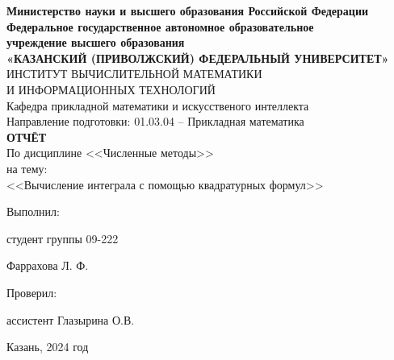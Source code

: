 \documentclass[a4paper,12pt]{article}
\begin{document}
\begin{center}
\hfill \break
\textbf{\large{Министерство науки и высшего образования Российской Федерации\\
Федеральное государственное автономное образовательное\\
учреждение высшего образования}}
\\
\large{\textbf{«КАЗАНСКИЙ (ПРИВОЛЖСКИЙ) ФЕДЕРАЛЬНЫЙ УНИВЕРСИТЕТ»}}\\
\hfill \break
\large{ИНСТИТУТ ВЫЧИСЛИТЕЛЬНОЙ МАТЕМАТИКИ\\ И ИНФОРМАЦИОННЫХ ТЕХНОЛОГИЙ}\\
 \hfill \break
\large{Кафедра прикладной математики и искусственого интеллекта}\\
\hfill\break
\hfill \break
\large{Направление подготовки: 01.03.04 – Прикладная математика}\\
\hfill \break
\hfill \break
\textbf{\large{ОТЧЁТ}}\\
\large{По дисциплине <<Численные методы>>}\\
\large{на тему:}\\
\large{<<Вычисление интеграла с помощью квадратурных формул>>}\\
\hfill \break
\hfill \break
\end{center}

\hfill \break
\begin{flushright}
			
    \large{Выполнил:}
    
    \large{студент группы 09-222}
    
    \large{Фаррахова Л. Ф.}
    
    \large{Проверил:}
    
    \large{ассистент Глазырина О.В.}
    
\end{flushright}
\vfill
\begin{center} \large{Казань, 2024 год} \end{center}
\thispagestyle{empty}
 

\newpage
\begin{center}
\renewcommand{\contentsname}{Содержание}
\fontsize{14}{1.15}\selectfont
\mdseries\selectfont{\tableofcontents}
\newpage
\end{center}
\end{document}
